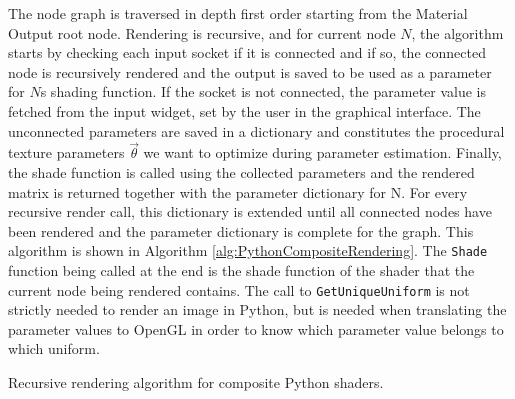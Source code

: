The node graph is traversed in depth first order starting from the Material Output root node. Rendering is recursive, and for current node $N$, the algorithm starts by checking each input socket if it is connected and if so, the connected node is recursively rendered and the output is saved to be used as a parameter for $N$s shading function. If the socket is not connected, the parameter value is fetched from the input widget, set by the user in the graphical interface. The unconnected parameters are saved in a dictionary and constitutes the procedural texture parameters $\vec{\theta}$ we want to optimize during parameter estimation. Finally, the shade function is called using the collected parameters and the rendered matrix is returned together with the parameter dictionary for N. For every recursive render call, this dictionary is extended until all connected nodes have been rendered and the parameter dictionary is complete for the graph. This algorithm is shown in Algorithm \ref{alg:PythonCompositeRendering}. The \texttt{Shade} function being called at the end is the shade function of the shader that the current node being rendered contains. The call to \texttt{GetUniqueUniform} is not strictly needed to render an image in Python, but is needed when translating the parameter values to OpenGL in order to know which parameter value belongs to which uniform.


\begin{algorithm}[H]
%


\caption{Recursive rendering algorithm for composite Python shaders.}
\label{alg:PythonCompositeRendering}
\end{algorithm}





